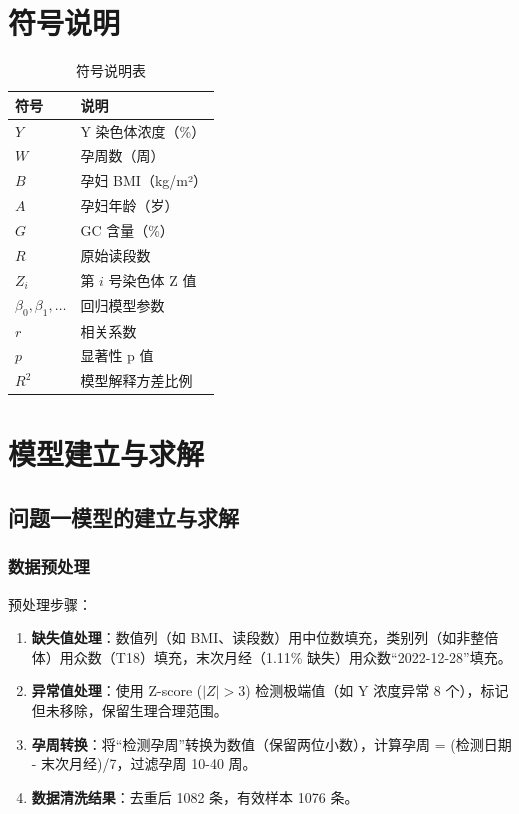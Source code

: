 \documentclass[withoutpreface,bwprint]{cumcmthesis} %
\begin{document}
\section{符号说明}

\begin{table}[h]
    \centering
    \begin{tabular}{ll}
        \toprule
        符号 & 说明 \\
        \midrule
        $Y$ & Y 染色体浓度（\%） \\
        $W$ & 孕周数（周） \\
        $B$ & 孕妇 BMI（kg/m²） \\
        $A$ & 孕妇年龄（岁） \\
        $G$ & GC 含量（\%） \\
        $R$ & 原始读段数 \\
        $Z_i$ & 第 $i$ 号染色体 Z 值 \\
        $\beta_0, \beta_1, \dots$ & 回归模型参数 \\
        $r$ & 相关系数 \\
        $p$ & 显著性 p 值 \\
        $R^2$ & 模型解释方差比例 \\
        \bottomrule
    \end{tabular}
    \caption{符号说明表}
    \label{tab:symbols}
\end{table}

\section{模型建立与求解}

\subsection{问题一模型的建立与求解}
\subsubsection{数据预处理}
预处理步骤：
\begin{enumerate}
    \item \textbf{缺失值处理}：数值列（如 BMI、读段数）用中位数填充，类别列（如非整倍体）用众数（T18）填充，末次月经（1.11\% 缺失）用众数“2022-12-28”填充。
    \item \textbf{异常值处理}：使用 Z-score ($|Z| > 3$) 检测极端值（如 Y 浓度异常 8 个），标记但未移除，保留生理合理范围。
    \item \textbf{孕周转换}：将“检测孕周”转换为数值（保留两位小数），计算孕周 = (检测日期 - 末次月经)/7，过滤孕周 10-40 周。
    \item \textbf{数据清洗结果}：去重后 1082 条，有效样本 1076 条。
\end{enumerate}
\end{document}
